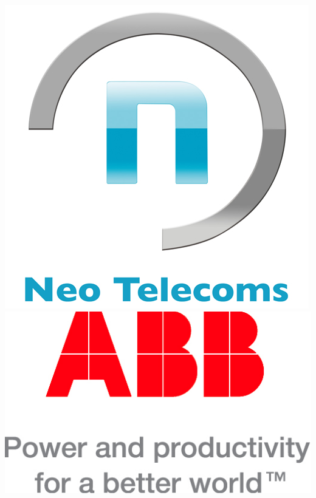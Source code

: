 \begin{frame}[c]
   \includegraphics[scale=0.125]{plots/pictures/Xavier/neo-telecoms.jpg}
   \hspace{2cm}
   \includegraphics[scale=0.5]{plots/pictures/Xavier/ABB.jpg}

\end{frame}
